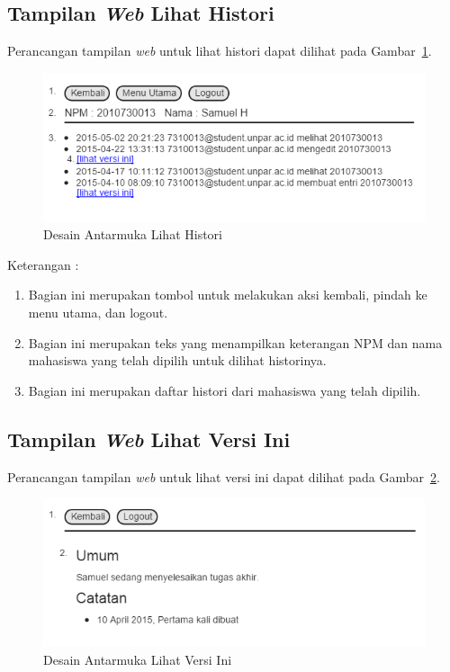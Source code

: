 \subsection{Tampilan {\it Web} Lihat Histori}
Perancangan tampilan {\it web} untuk lihat histori dapat dilihat pada Gambar~\ref{fig:lihathistori}.
\begin{figure}[ht]
\centering
\includegraphics[scale=0.9]{Gambar/lihathistori.png}
\caption[Desain Antarmuka Lihat Histori]{Desain Antarmuka Lihat Histori}
\label{fig:lihathistori}
\end{figure}

Keterangan :
\begin{enumerate}[(1)]
\item
Bagian ini merupakan tombol untuk melakukan aksi kembali, pindah ke menu utama,
dan logout.
\item
Bagian ini merupakan teks yang menampilkan keterangan NPM dan nama mahasiswa
yang telah dipilih untuk dilihat historinya.
\item
Bagian ini merupakan daftar histori dari mahasiswa yang telah dipilih.
\end{enumerate}

\subsection{Tampilan {\it Web} Lihat Versi Ini}
Perancangan tampilan {\it web} untuk lihat versi ini dapat dilihat pada
Gambar~\ref{fig:lihatversiini}.
\begin{figure}[ht]
\centering
\includegraphics[scale=0.9]{Gambar/lihatversiini.png}
\caption[Desain Antarmuka Lihat Versi Ini]{Desain Antarmuka Lihat Versi Ini}
\label{fig:lihatversiini}
\end{figure}

